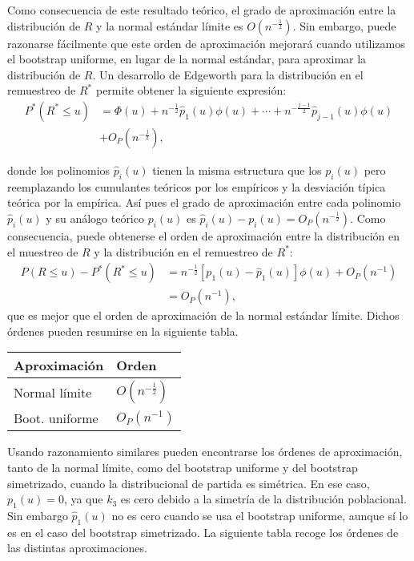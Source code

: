 \documentclass[
]{book}
\theoremstyle{break}
\theoremstyle{definition}
\theoremstyle{definition}
\theoremstyle{definition}
\theoremstyle{remark}
\begin{document}
Como consecuencia de este resultado teórico, el grado de aproximación
entre la distribución de \(R\) y la normal estándar límite es
\(O (n^{-\frac{1}{2}})\). Sin embargo, puede razonarse
fácilmente que este orden de aproximación mejorará cuando utilizamos el
bootstrap uniforme, en lugar de la normal estándar, para aproximar la
distribución de \(R\). Un desarrollo de Edgeworth para la distribución en
el remuestreo de \(R^{\ast}\) permite obtener la siguiente expresión:
\[\begin{aligned}
P^{\ast}\left( R^{\ast}\leq u \right) &= \Phi \left( u \right) +n^{-\frac{1}{2}
}\hat{p}_1\left( u \right) \phi \left( u \right) +\cdots +n^{-\frac{j-1}{2}}
\hat{p}_{j-1}\left( u \right) \phi \left( u \right) \\
&+ O_{P}\left( n^{-\frac{j}{2}} \right),
\end{aligned}\]

donde los polinomios \(\hat{p}_i\left( u \right)\) tienen la misma
estructura que los \(p_i\left( u \right)\) pero reemplazando los
cumulantes teóricos por los empíricos y la desviación típica teórica por
la empírica. Así pues el grado de aproximación entre cada polinomio
\(\hat{p}_i( u )\) y su análogo teórico \(p_i( u )\) es
\(\hat{p}_i( u ) -p_i( u ) = O_{P}( n^{-\frac{1}{2}} )\).
Como consecuencia, puede obtenerse el orden de aproximación entre la distribución
en el muestreo de \(R\) y la distribución en el remuestreo de \(R^{\ast}\):
\[\begin{aligned}
P\left( R\leq u \right) -P^{\ast}\left( R^{\ast}\leq u \right) &=  n^{-\frac{1}{
2}}\left[ p_1\left( u \right) -\hat{p}_1\left( u \right) \right] \phi
\left( u \right) +O_{P}\left( n^{-1} \right) \\
&=  O_{P}\left( n^{-1} \right),\end{aligned}\]que es mejor que el orden
de aproximación de la normal estándar límite. Dichos órdenes pueden
resumirse en la siguiente tabla.

\begin{longtable}[]{@{}ll@{}}
\toprule
Aproximación & Orden\tabularnewline
\midrule
\endhead
Normal límite & \(O\left( n^{-\frac{1}{2}} \right)\)\tabularnewline
Boot. uniforme & \(O_{P}\left( n^{-1} \right)\)\tabularnewline
\bottomrule
\end{longtable}

Usando razonamiento similares pueden encontrarse los órdenes de
aproximación, tanto de la normal límite, como del bootstrap uniforme y
del bootstrap simetrizado, cuando la distribucional de partida es
simétrica. En ese caso, \(p_1\left( u \right) =0\), ya que \(k_3\) es
cero debido a la simetría de la distribución poblacional. Sin embargo
\(\hat{p}_1\left( u \right)\) no es cero cuando se usa el bootstrap
uniforme, aunque sí lo es en el caso del bootstrap simetrizado. La
siguiente tabla recoge los órdenes de las distintas aproximaciones.
\end{document}
